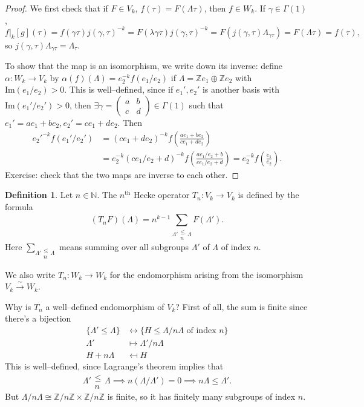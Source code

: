 \documentclass{article}
\theoremstyle{definition}
\newtheorem{defn}{Definition}[section]
\begin{document}
\begin{proof}
    We first check that if $F \in V_k$, $f(\tau) = F(\Lambda \tau)$, then $f \in W_k$. If $\gamma \in \Gamma(1)$, $$f|_k[g](\tau) = f(\gamma \tau)j(\gamma,\tau)^{-k} = F(\lambda \gamma \tau)j(\gamma,\tau)^{-k} = F(j(\gamma,\tau)\Lambda_{\gamma \tau}) = F(\Lambda \tau) = f(\tau),$$
    so $j(\gamma,\tau)\Lambda_{\gamma \tau}= \Lambda_\tau$.
    \vspace{1mm}
     
    To show that the map is an isomorphism, we write down its inverse: define $\alpha:W_k \to V_k$ by $\alpha(f)(\Lambda) = e_2^{-k}f(e_1/e_2)$ if $\Lambda= \mathbb{Z}e_1 \oplus \mathbb{Z}e_2$ with $\text{Im}(e_1/e_2)>0$. This is well--defined, since if $e_1',e_2'$ is another basis with $\text{Im}(e_1'/e_2')>0$, then $\exists \gamma  = \begin{pmatrix} a&b \\c&d \end{pmatrix}\in \Gamma(1)$ such that $e_1' = ae_1 + be_2, e_2' = ce_1 + de_2$. Then 
    \begin{align*}
        e_2'^{-k} f(e_1'/e_2') &= (ce_1 + de_2)^{-k}f\left(\frac{ae_1 +be_2}{ce_1+de_2}\right) \\&= e_2^{-k}(ce_1/e_2 + d)^{-k} f \left(\frac{ae_1/e_2 + b}{ce_1/e_2+d}\right) = e_2^{-k}f\left(\frac{e_1}{e_2}\right).
    \end{align*}
    Exercise: check that the two maps are inverse to each other.
\end{proof}


\begin{defn}
    Let $n \in \mathbb{N}$. The $n^{\text{th}}$ Hecke operator $T_n: V_k \to V_k$ is defined by the formula \[
    (T_n F)(\Lambda) = n^{k-1}\sum_{\Lambda' \substack{\le \\ n} \Lambda}^{} F(\Lambda').
    \]
    Here $\sum_{\Lambda' \substack{\le \\ n} \Lambda}^{}$ means summing over all subgroups $\Lambda'$ of $\Lambda$ of index $n$.
    \vspace{1mm}
     
    We also write $T_n : W_k \to W_k$ for the endomorphism arising from the isomorphism $V_k \stackrel{\sim}{\to}  W_k$.
\end{defn}
Why is $T_n$ a well--defined endomorphism of $V_k$? First of all, the sum is finite since there's a bijection 
\begin{align*}
    \{\Lambda' \le \Lambda\} &\leftrightarrow \{H \le \Lambda/n \Lambda \text{ of index }n\}\\
    \Lambda' &\mapsto \Lambda'/n \Lambda\\
    H + n \Lambda &\mapsfrom H
\end{align*}
This is well--defined, since Lagrange's theorem implies that $$\Lambda' \substack{\le \\n} \Lambda \implies n(\Lambda/\Lambda') = 0 \implies n \Lambda \le \Lambda'.$$ But $\Lambda/n \Lambda \cong \mathbb{Z}/n\mathbb{Z} \times \mathbb{Z}/n\mathbb{Z}$ is finite, so it has finitely many subgroups of index $n$.
\vspace{1mm}
 
\end{document}
